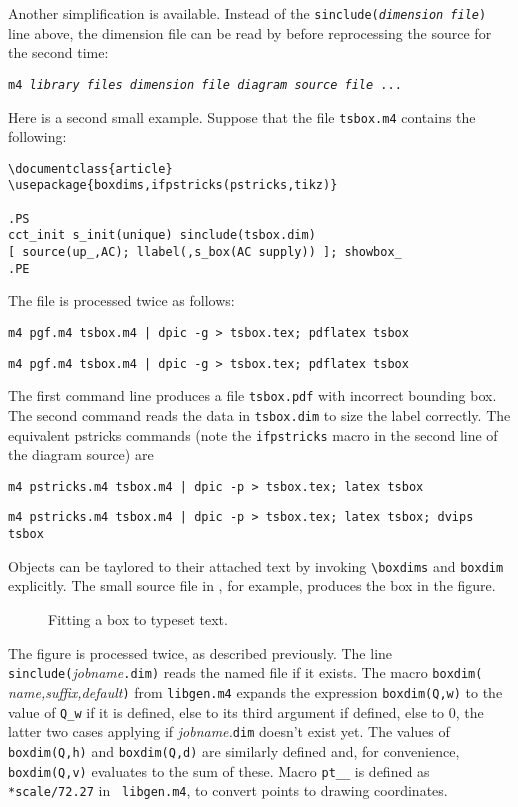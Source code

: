 Another simplification is available.  Instead of the
{\tt sinclude({\sl dimension file})} line
above, the dimension file can be read by \Mfour before reprocessing the source
for the second time:

{\tt m4 {\sl library files} {\sl dimension file} {\sl diagram source file} ...} 

Here is a second small example.  Suppose that the file {\tt tsbox.m4} contains
the following:

\begin{verbatim}
\documentclass{article}
\usepackage{boxdims,ifpstricks(pstricks,tikz)}

.PS
cct_init s_init(unique) sinclude(tsbox.dim)
[ source(up_,AC); llabel(,s_box(AC supply)) ]; showbox_
.PE

\end{verbatim}
The file is processed twice as follows:

{\tt m4 pgf.m4 tsbox.m4 | dpic -g > tsbox.tex; pdflatex tsbox}
\par
{\tt m4 pgf.m4 tsbox.m4 | dpic -g > tsbox.tex; pdflatex tsbox}

\noindent
The first command line produces a file {\tt tsbox.pdf} with
incorrect bounding box.  The second command reads the data in {\tt tsbox.dim}
to size the label correctly.  The equivalent pstricks commands (note
the {\tt ifpstricks} macro in the second line of the diagram source) are

{\tt m4 pstricks.m4 tsbox.m4 | dpic -p > tsbox.tex; latex tsbox}
\par
{\tt m4 pstricks.m4 tsbox.m4 | dpic -p > tsbox.tex; latex tsbox; dvips tsbox}
 
\hbox{}

Objects can be taylored to their attached text by invoking
\verb|\boxdims| and \verb|boxdim| explicitly.
The small source file in , for example,
produces the box in the figure.
\begin{figure}[ht]
   \parbox{4.2in}{\small  }%
   \hfill\llap{\raise-0.35in\hbox{ }}%
   \vspace{-\baselineskip}
   \caption{Fitting a box to typeset text.}
   \label{boxdims}
   \end{figure}

The figure is processed twice, as described previously.
The line \verb|sinclude(|{\sl jobname}\verb|.dim)| reads the named file
if it exists.  The macro \verb|boxdim(|{\sl
name,suffix,default}\verb|)| from {\tt libgen.m4} expands the
expression \verb|boxdim(Q,w)| to the value of \verb|Q_w| if it is
defined, else to its third argument if defined, else to 0, the latter
two cases applying if {\sl jobname.}\verb|dim| doesn't exist yet.  The
values of \verb|boxdim(Q,h)| and \verb|boxdim(Q,d)| are similarly
defined and, for convenience, \verb|boxdim(Q,v)| evaluates to the sum
of these.  Macro \verb|pt__| is defined as \verb|*scale/72.27| in {\tt
libgen.m4}, to convert points to drawing coordinates.

